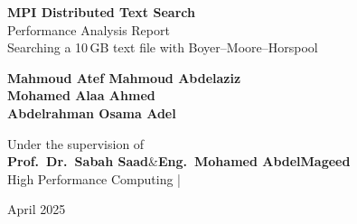 \documentclass[11pt,a4paper]{article}
\begin{document}
\begin{titlepage}

\vspace*{1.5cm}
\begin{center}
  {\color{black}\fontsize{22}{28}\selectfont\bfseries MPI Distributed Text Search}\\[0.4cm]
  {\color{white!80}\large Performance Analysis Report}\\[0.3cm]
  {\color{white!60}\normalsize Searching a 10\,GB text file with Boyer--Moore--Horspool}
\end{center}

\vspace{3.5cm}

\begin{center}
\begin{tcolorbox}[width=0.75\textwidth,
  colback=white, colframe=primary,
  boxrule=1pt, arc=6pt,
  title={\color{white}\bfseries Team Members},
  colbacktitle=primary]
  \centering
  \textbf{Mahmoud Atef Mahmoud Abdelaziz}\\[3pt]
  \textbf{Mohamed Alaa Ahmed}\\[3pt]
  \textbf{Abdelrahman Osama Adel}
\end{tcolorbox}
\end{center}

\vspace{1.2cm}

\begin{center}
\begin{tcolorbox}[width=0.75\textwidth,
  colback=lightgray, colframe=accent,
  boxrule=0.8pt, arc=6pt]
  \centering
  \small Under the supervision of\\[4pt]
  \textbf{Prof.\ Dr.\ Sabah Saad}\quad\&\quad\textbf{Eng.\ Mohamed AbdelMageed}\\[4pt]
  High Performance Computing \quad|
\end{tcolorbox}
\end{center}

\vfill
\begin{center}
  \color{white}\small April 2025
\end{center}
\end{titlepage}
\end{document}
